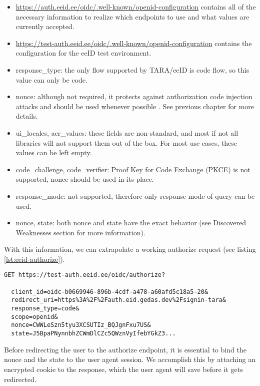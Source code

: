\begin{itemize}
  \item \url{https://auth.eeid.ee/oidc/.well-known/openid-configuration} contains all of the necessary information to realize which endpoints to use and what values are currently accepted.
  \item \url{https://test-auth.eeid.ee/oidc/.well-known/openid-configuration} contains the configuration for the eeID test environment.
  \item {response\_type}: the only flow supported by TARA/eeID is code flow, so this value can only be code.
  \item {nonce}: although not required, it protects against authorization code injection attacks and should be used whenever possible \cite{ietf-oauth-security-topics-19}. See previous chapter for more details.
  \item {ui\_locales, acr\_values}: these fields are non-standard, and most if not all libraries will not support them out of the box. For most use cases, these values can be left empty.
  \item {code\_challenge, code\_verifier}: Proof Key for Code Exchange (PKCE) is not supported, {nonce} should be used in its place.
  \item {response\_mode}: not supported, therefore only response mode of {query} can be used.
  \item {nonce, state}: both nonce and state have the exact behavior (see Discovered Weaknesses section for more information).
\end{itemize}

With this information, we can extrapolate a working {authorize} request (see listing \ref{lst:eeid-authorize}).

\begin{lstlisting}[caption={The eeID service authorize endpoint request}, label={lst:eeid-authorize}]
  GET https://test-auth.eeid.ee/oidc/authorize?

  client_id=oidc-b0669946-896b-4cdf-a478-a60afd5c18a5-20&
  redirect_uri=https%3A%2F%2Fauth.eid.gedas.dev%2Fsignin-tara&
  response_type=code&
  scope=openid&
  nonce=CWWLeSzn5tyu3XCSUTIz_BQJgnFxu7US&
  state=J5BpaPNynnbhZCWmDlCZc5QWznVyIfebYGkZ3...
\end{lstlisting}

Before redirecting the user to the {authorize} endpoint, it is essential to bind the nonce and the state to the user agent session. We accomplish this by attaching an encrypted cookie to the response, which the user agent will save before it gets redirected.


